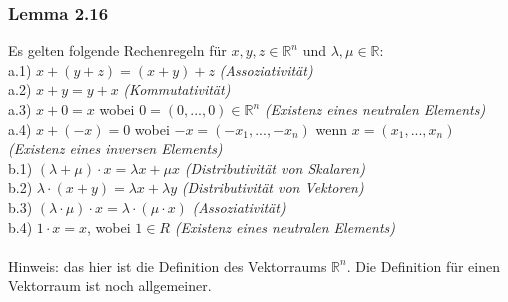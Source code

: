 \documentclass{article}
\begin{document}
\subsubsection*{Lemma 2.16}
Es gelten folgende Rechenregeln für $x,y,z \in \mathbb{R}^n$ und $\lambda, \mu \in \mathbb{R}$: \\
a.1) $x+(y+z) = (x+y)+z$ \textit{(Assoziativität)}\\ 
a.2) $x+y = y+x$ \textit{(Kommutativität)}\\
a.3) $x+0 = x$ wobei $0=(0, ..., 0) \in \mathbb{R}^n$ \textit{(Existenz eines neutralen Elements)}\\
a.4) $x+(-x) = 0$ wobei $-x=(-x_1, ..., -x_n)$ wenn $x=(x_1, ..., x_n)$ \textit{(Existenz eines inversen Elements)}\\
b.1) $(\lambda + \mu) \cdot x = \lambda x + \mu x$ \textit{(Distributivität von Skalaren)}\\
b.2) $\lambda \cdot (x+y) = \lambda x + \lambda y$ \textit{(Distributivität von Vektoren)}\\
b.3) $(\lambda \cdot \mu) \cdot x = \lambda \cdot (\mu \cdot x)$ \textit{(Assoziativität)}\\
b.4) $1 \cdot x = x$, wobei $1 \in R$ \textit{(Existenz eines neutralen Elements)}\\
\\
Hinweis: das hier ist die Definition des Vektorraums $\mathbb{R}^n$. Die Definition für einen Vektorraum ist noch allgemeiner. \\
\\
\end{document}
